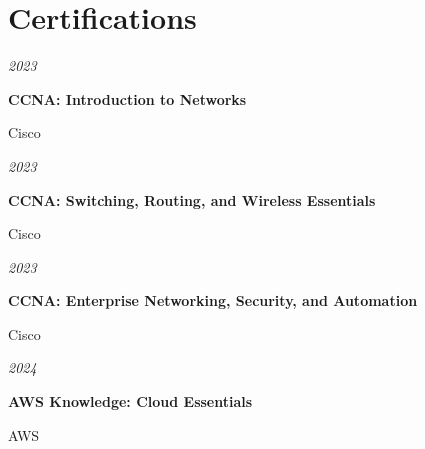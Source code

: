 \documentclass[../main.tex]{subfiles}
\begin{document}
     \section{Certifications}

        \begin{twocolentry}{
        \textit{2023}}

            \textbf{CCNA: Introduction to Networks}

            Cisco

        \end{twocolentry}
        \vspace{0.10 cm}
    
        \begin{twocolentry}{
        \textit{2023}}

            \textbf{CCNA: Switching, Routing, and Wireless Essentials}
            
            Cisco

        \end{twocolentry}
 
    
        \vspace{0.10 cm}
    
        \begin{twocolentry}{
        \textit{2023}}

            \textbf{CCNA: Enterprise Networking, Security, and Automation} 

            Cisco
        \end{twocolentry}
        \vspace{0.10 cm}
    
        \begin{twocolentry}{
        \textit{2024}}

            \textbf{AWS Knowledge: Cloud Essentials}

            AWS

        \end{twocolentry}
 
\end{document}
